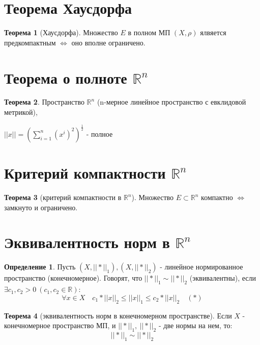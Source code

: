 \documentclass{report}
\theoremstyle{definition}
\newtheorem*{definition}{Определение}
\newtheorem*{theorem}{Теорема}
\begin{document}
\section{Теорема Хаусдорфа}

\begin{theorem}[Хаусдорфа]
    Множество $E$ в полном МП $(X,\rho)$ ялвяется предкомпактным $\iff$ оно вполне ограничено.
\end{theorem}

\section{Теорема о полноте $\mathbb{R}^n$}

\begin{theorem}
    Пространство $\mathbb{R}^n$ (n-мерное линейное пространство с евклидовой метрикой),
    \begin{center}
        $||x|| = (\sum_{i=1}^{n} (x^i)^2)^\frac{1}{2}$ - полное
    \end{center}
\end{theorem}

\section{Критерий компактности $\mathbb{R}^n$}

\begin{theorem}[критерий компактности в $\mathbb{R}^n$]
    Множество $E \subset \mathbb{R}^n$ компактно $\iff$ замкнуто и ограничено.
\end{theorem}

\section{Эквивалентность норм в $\mathbb{R}^n$}

\begin{definition}
    Пусть $(X, ||*||_1),(X, ||*||_2)$ - линейное нормированное пространство (конечномерное). Говорят, что $||*||_1
        \sim ||*||_2$ (эквивалентны), если $\exists c_1,c_2 > 0 \ (c_1,c_2 \in \mathbb{R}):$
    \begin{equation*}
        \forall x \in X \quad c_1 * ||x||_2 \leqslant ||x||_1 \leqslant c_2 * ||x||_2 \quad (*)
    \end{equation*}
\end{definition}

\begin{theorem}[эквивалентность норм в конечномерном пространстве]
    Если $X$ - конечномерное пространство МП, и $||*||_1, \ ||*||_2$ - две нормы на нем, то:
    \begin{equation*}
        ||*||_1 \sim ||*||_2
    \end{equation*}
\end{theorem}
\end{document}
